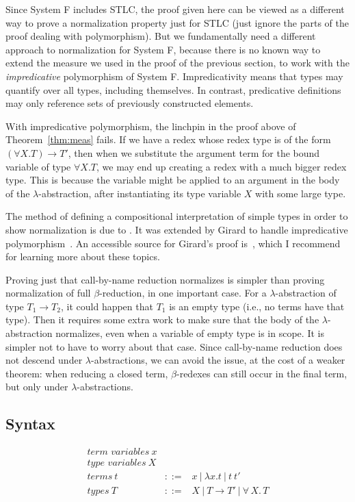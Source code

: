 \documentclass{article}
\begin{document}
Since System F includes STLC, the proof given here can be viewed as a
different way to prove a normalization property just for STLC (just
ignore the parts of the proof dealing with polymorphism).  But we
fundamentally need a different approach to normalization for System F,
because there is no known way to extend the measure we used in the
proof of the previous section, to work with the \emph{impredicative} polymorphism
of System F.  Impredicativity means that types may quantify over all types,
including themselves.  In contrast, predicative definitions may only
reference sets of previously constructed elements.

With impredicative polymorphism, the linchpin in the proof above of
Theorem~\ref{thm:meas} fails.  If we have a redex whose redex type is
of the form $(\forall X.T) \to T'$, then when we substitute the
argument term for the bound variable of type $\forall X.T$, we may end
up creating a redex with a much bigger redex type.  This is because
the variable might be applied to an argument in the body of the
$\lambda$-abstraction, after instantiating its type variable $X$ with
some large type.

The method of defining a compositional interpretation of simple types in
order to show normalization is due to \citet{tait67}.  It was extended by Girard
to handle impredicative polymorphism~\citep{girard72}.  An accessible source
for Girard's proof is~\citet{girard1989}, which
I recommend for learning more about these topics.

Proving just that call-by-name reduction normalizes is simpler than
proving normalization of full $\beta$-reduction, in one important
case.  For a $\lambda$-abstraction of type $T_1 \to T_2$, it could
happen that $T_1$ is an empty type (i.e., no terms have that type).
Then it requires some extra work to make sure that the body of the
$\lambda$-abstraction normalizes, even when a variable of empty type
is in scope.  It is simpler not to have to worry about that case.
Since call-by-name reduction does not descend under
$\lambda$-abstractions, we can avoid the issue, at the cost of a
weaker theorem: when reducing a closed term, $\beta$-redexes can still
occur in the final term, but only under $\lambda$-abstractions.

\subsection{Syntax}
\label{sec:syntax}

\[
\begin{array}{lll}
\textit{term variables}\ x & \ & \ \\
\textit{type variables}\ X & \ & \ \\
\textit{terms}\ t & ::= & x \ |\ \lambda x .t\ |\ t\ t'\\
\textit{types}\ T & ::= & X\ |\ T \to T'\ |\ \forall\, X.\, T
\end{array}
\]
\end{document}
